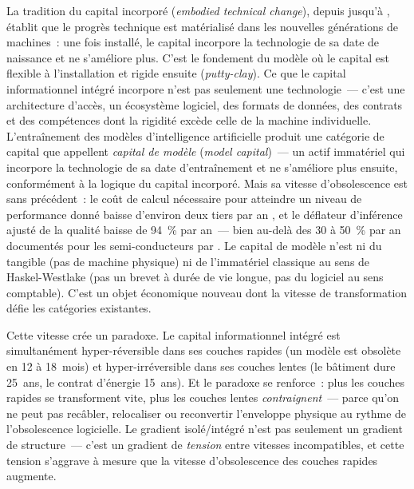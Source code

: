 \markNEO \markSTS
La tradition du capital incorporé (\emph{embodied technical change}), depuis \textcite{solow_investment_1960} jusqu'à \textcite{johansen_substitution_1959}, établit que le progrès technique est matérialisé dans les nouvelles générations de machines~: une fois installé, le capital incorpore la technologie de sa date de naissance et ne s'améliore plus. C'est le fondement du modèle où le capital est flexible à l'installation et rigide ensuite (\emph{putty-clay}). Ce que le capital informationnel intégré incorpore n'est pas seulement une technologie~--- c'est une architecture d'accès, un écosystème logiciel, des formats de données, des contrats et des compétences dont la rigidité excède celle de la machine individuelle. L'entraînement des modèles d'intelligence artificielle produit une catégorie de capital que \textcite{korinek_mckelvey_2026} appellent \emph{capital de modèle} (\emph{model capital})~--- un actif immatériel qui incorpore la technologie de sa date d'entraînement et ne s'améliore plus ensuite, conformément à la logique du capital incorporé. Mais sa vitesse d'obsolescence est sans précédent~: le coût de calcul nécessaire pour atteindre un niveau de performance donné baisse d'environ deux tiers par an \parencite{ho_algorithmic_2024}, et le déflateur d'inférence ajusté de la qualité baisse de 94~\% par an~--- bien au-delà des 30 à 50~\% par an documentés pour les semi-conducteurs par \textcite{byrne_semiconductor_2018}. Le capital de modèle n'est ni du tangible (pas de machine physique) ni de l'immatériel classique au sens de Haskel-Westlake (pas un brevet à durée de vie longue, pas du logiciel au sens comptable). C'est un objet économique nouveau dont la vitesse de transformation défie les catégories existantes.

Cette vitesse crée un paradoxe. Le capital informationnel intégré est simultanément hyper-réversible dans ses couches rapides (un modèle est obsolète en 12 à 18~mois) et hyper-irréversible dans ses couches lentes (le bâtiment dure 25~ans, le contrat d'énergie 15~ans). Et le paradoxe se renforce~: plus les couches rapides se transforment vite, plus les couches lentes \emph{contraignent}~--- parce qu'on ne peut pas recâbler, relocaliser ou reconvertir l'enveloppe physique au rythme de l'obsolescence logicielle. Le gradient isolé/intégré n'est pas seulement un gradient de structure~--- c'est un gradient de \emph{tension} entre vitesses incompatibles, et cette tension s'aggrave à mesure que la vitesse d'obsolescence des couches rapides augmente.

